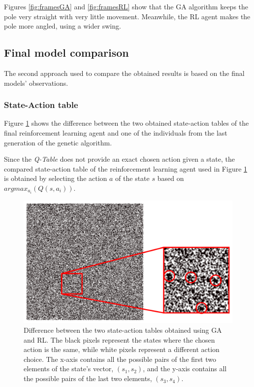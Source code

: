 Figures \ref{fig:framesGA} and \ref{fig:framesRL} show that the GA algorithm keeps the pole very straight with very little movement.
Meanwhile, the RL agent makes the pole more angled, using a wider swing.

\subsection{Final model comparison}

The second approach used to compare the obtained results is based on the final models' observations.

\subsubsection{State-Action table}

Figure \ref{figTABLEDIFF} shows the difference between the two obtained state-action tables of the final reinforcement learning agent and one of the individuals from the last generation of the genetic algorithm.

Since the \textit{Q-Table} does not provide an exact chosen action given a state, the compared state-action table of the reinforcement learning agent used in Figure \ref{figTABLEDIFF} is obtained by selecting the action $a$ of the state $s$ based on $argmax_{a_i} (Q(s,a_i))$.

\begin{figure}[H]
	\centering
	\includegraphics [width=\linewidth]{Images/diff_zoomed.png}
	\caption{Difference between the two state-action tables obtained using GA and RL. The black pixels represent the states where the chosen action is the same, while white pixels represent a different action choice. The x-axis contains all the possible pairs of the first two elements of the state's vector, $(s_1,s_2)$, and the y-axis contains all the possible pairs of the last two elements, $(s_3,s_4)$. }
	\label{figTABLEDIFF}
\end{figure}


